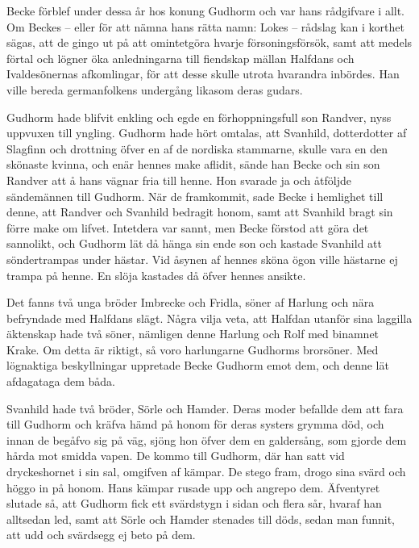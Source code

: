 Becke förblef under dessa år hos konung Gudhorm och var hans rådgifvare
i allt. Om Beckes -- eller för att nämna hans rätta namn: Lokes --
rådslag kan i korthet sägas, att de gingo ut på att omintetgöra hvarje
försoningsförsök, samt att medels förtal och lögner öka anledningarna
till fiendskap mällan Halfdans och Ivaldesönernas afkomlingar, för att
desse skulle utrota hvarandra inbördes. Han ville bereda germanfolkens
undergång likasom deras gudars.

Gudhorm hade blifvit enkling och egde en förhoppningsfull son Randver,
nyss uppvuxen till yngling. Gudhorm hade hört omtalas, att Svanhild,
dotterdotter af Slagfinn och drottning öfver en af de nordiska
stammarne, skulle vara en den skönaste kvinna, och enär hennes make
aflidit, sände han Becke och sin son Randver att å hans vägnar fria till
henne. Hon svarade ja och åtföljde sändemännen till Gudhorm. När de
framkommit, sade Becke i hemlighet till denne, att
Randver\protect\hypertarget{lb1625905.xhtmlux5cux23start162}{}{}\protect\hypertarget{lb1625905.xhtmlux5cux23start162-a}{}{}\protect\hypertarget{lb1625905.xhtmlux5cux23start162-b}{}{}\protect\hypertarget{lb1625905.xhtmlux5cux23start162-c}{}{}\protect\hypertarget{lb1625905.xhtmlux5cux23start162-d}{}{}
och Svanhild bedragit honom, samt att Svanhild bragt sin förre make om
lifvet. Intetdera var sannt, men Becke förstod att göra det sannolikt,
och Gudhorm lät då hänga sin ende son och kastade Svanhild att
söndertrampas under hästar. Vid åsynen af hennes sköna ögon ville
hästarne ej trampa på henne. En slöja kastades då öfver hennes ansikte.

Det fanns två unga bröder Imbrecke och Fridla, söner af Harlung och nära
befryndade med Halfdans slägt. Några vilja veta, att Halfdan utanför
sina laggilla äktenskap hade två söner, nämligen denne Harlung och Rolf
med binamnet Krake. Om detta är riktigt, så voro harlungarne Gudhorms
brorsöner. Med lögnaktiga beskyllningar uppretade Becke Gudhorm emot
dem, och denne lät afdagataga dem båda.

Svanhild hade två bröder, Sörle och Hamder. Deras moder befallde dem att
fara till Gudhorm och kräfva hämd på honom för deras systers grymma död,
och innan de begåfvo sig på väg, sjöng hon öfver dem en galdersång, som
gjorde dem hårda mot smidda vapen. De kommo till Gudhorm, där han satt
vid dryckeshornet i sin sal, omgifven af kämpar. De stego fram, drogo
sina svärd och höggo in på honom. Hans kämpar rusade upp och angrepo
dem. Äfventyret slutade så, att Gudhorm fick ett svärdstygn i sidan och
flera sår, hvaraf han alltsedan led, samt att Sörle och Hamder stenades
till döds, sedan man funnit, att udd och svärdsegg ej beto på dem.


